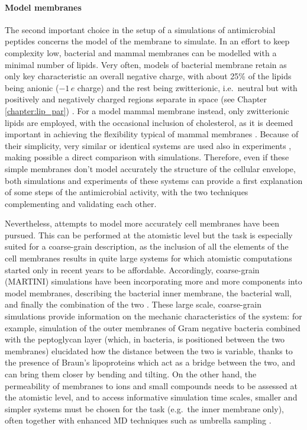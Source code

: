 \paragraph{Model membranes} The second important choice in the setup of a simulations of antimicrobial peptides concerns the model of the membrane to simulate. In an effort to keep complexity low, bacterial and mammal membranes can be modelled with a minimal number of lipids.
%
Very often, models of bacterial membrane retain as only key characteristic an overall negative charge, with about 25\% of the lipids being anionic ($-1\,e$ charge) and the rest being zwitterionic, i.e.\ neutral but with positively and negatively charged regions separate in space (see Chapter \ref{chapter:lip_par}) \cite{Lipkin2017,Wang2012,Zhao2018,Chen2019}.
For a model mammal membrane instead, only zwitterionic lipids are employed, with the occasional inclusion of cholesterol, as it is deemed important in achieving the flexibility typical of mammal membranes \cite{Lipkin2017,Wang2012,Zhao2018,Chen2019,Risselada2008}.
Because of their simplicity, very similar or identical systems are used also in experiments \cite{Castelletto2016,Tang2009,Glukhov2005}, making possible a direct comparison with simulations.
Therefore, even if these simple membranes don't model accurately the structure of the cellular envelope, both simulations and experiments of these systems can provide a first explanation of some steps of the antimicrobial activity, with the two techniques complementing and validating each other.

Nevertheless, attempts to model more accurately cell membranes have been pursued. This can be performed at the atomistic level \cite{Piggot2011}
but the task is especially suited for a coarse-grain description, as the inclusion of all the elements of the cell membranes results in quite large systems for which atomistic computations started only in recent years to be affordable.
%
Accordingly, coarse-grain (MARTINI) simulations have been incorporating more and more components into model membranes, describing the bacterial inner membrane, the bacterial wall, and finally the combination of the two \cite{Khalid2019}.
%
These large scale, coarse-grain simulations provide information on the mechanic characteristics of the system: for example, simulation of the outer membranes of Gram negative bacteria combined with the peptoglycan layer (which, in bacteria, is positioned between the two membranes) elucidated how the distance between the two is variable, thanks to the presence of Braun's lipoproteins which act as a bridge between the two, and can bring them closer by bending and tilting.
%
On the other hand, the permeability of membranes to ions and small compounds needs to be assessed at the atomistic level, and to access informative simulation time scales, smaller and simpler systems must be chosen for the task (e.g.\ the inner membrane only), often together with enhanced MD techniques such as umbrella sampling \cite{Piggot2011,Carpenter2016}.


